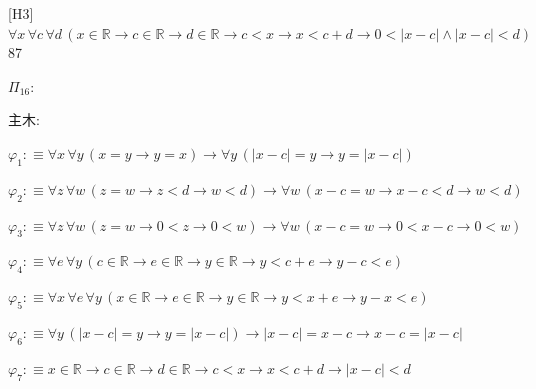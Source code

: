 \begin{fullproof}{[H3]}{$\forall x\,\forall c\,\forall d\,(x \in \mathbb{R} \to c \in \mathbb{R} \to d \in \mathbb{R} \to c < x \to x < c + d \to 0 < \lvert x - c \rvert \land \lvert x - c \rvert < d)$}{87}
\begin{ptree}
\end{ptree}
\noindent$\Pi_{16}$:
\begin{ptree}
\noLine
{}
\end{ptree}
\noindent 主木:
\begin{ptree}
\noLine
{}
\noLine
{}
\end{ptree}
\begin{abbrevlist}
\item $\varphi_{1} :\equiv \forall x\,\forall y\,(x = y \to y = x) \to \forall y\,(\lvert x - c \rvert = y \to y = \lvert x - c \rvert)$
\item $\varphi_{2} :\equiv \forall z\,\forall w\,(z = w \to z < d \to w < d) \to \forall w\,(x - c = w \to x - c < d \to w < d)$
\item $\varphi_{3} :\equiv \forall z\,\forall w\,(z = w \to 0 < z \to 0 < w) \to \forall w\,(x - c = w \to 0 < x - c \to 0 < w)$
\item $\varphi_{4} :\equiv \forall e\,\forall y\,(c \in \mathbb{R} \to e \in \mathbb{R} \to y \in \mathbb{R} \to y < c + e \to y - c < e)$
\item $\varphi_{5} :\equiv \forall x\,\forall e\,\forall y\,(x \in \mathbb{R} \to e \in \mathbb{R} \to y \in \mathbb{R} \to y < x + e \to y - x < e)$
\item $\varphi_{6} :\equiv \forall y\,(\lvert x - c \rvert = y \to y = \lvert x - c \rvert) \to \lvert x - c \rvert = x - c \to x - c = \lvert x - c \rvert$
\item $\varphi_{7} :\equiv x \in \mathbb{R} \to c \in \mathbb{R} \to d \in \mathbb{R} \to c < x \to x < c + d \to \lvert x - c \rvert < d$

\end{abbrevlist}
\end{fullproof}
